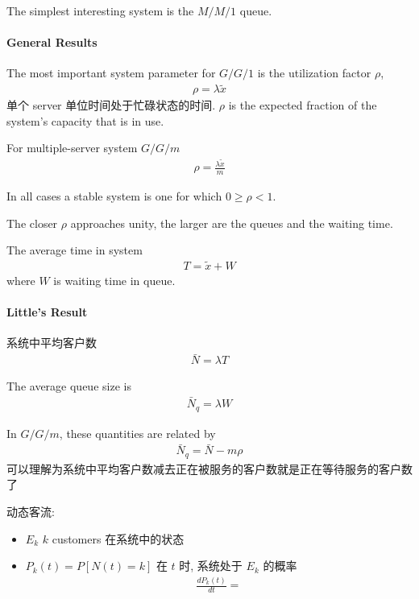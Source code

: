 The simplest interesting system is the $M/M/1$ queue. 

\paragraph{General Results} The most important system parameter for $G/G/1$ is the utilization
factor $\rho$, 
\begin{align*}
    \rho=\lambda\tilde{x}
\end{align*}
单个 server 单位时间处于忙碌状态的时间. $\rho$ is the expected fraction of the system's capacity that is in use.

For multiple-server system $G/G/m$ 
\begin{align*}
    \rho=\frac{\lambda\tilde{x}}{m}
\end{align*}

In all cases a stable system is one for which $0\ge \rho<1$. 

The closer $\rho$ approaches unity, the larger are the queues and the waiting time.

The average time in system
\begin{align*}
    T=\tilde{x}+W
\end{align*}
where $W$ is waiting time in queue. 


\paragraph{Little's Result} 系统中平均客户数
\begin{align*}
    \bar{N}=\lambda T
\end{align*}

The average queue size is 
\begin{align*}
    \bar{N}_q=\lambda W
\end{align*}

In $G/G/m$, these quantities are related by
\begin{align*}
    \bar{N}_q=\bar{N}-m\rho
\end{align*}
可以理解为系统中平均客户数减去正在被服务的客户数就是正在等待服务的客户数了

动态客流:
\begin{itemize}
    \item $E_k$ $k$ customers 在系统中的状态
    \item $P_k(t)=P[N(t)=k]$ 在 $t$ 时, 系统处于 $E_k$ 的概率
    \begin{align*}
        \frac{dP_k(t)}{dt}=
    \end{align*}
\end{itemize}

